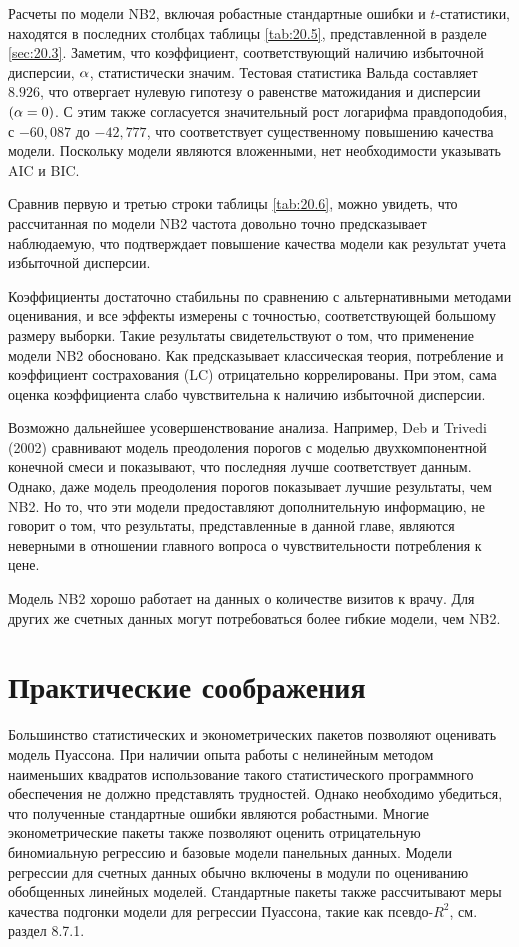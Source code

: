 Расчеты по модели NB2, включая робастные стандартные ошибки и $t$-статистики, находятся в последних столбцах таблицы \ref{tab:20.5}, представленной в разделе \ref{sec:20.3}. Заметим, что коэффициент, соответствующий наличию избыточной дисперсии, $\alpha$, статистически значим.
Тестовая статистика Вальда составляет $8.926$, что отвергает нулевую гипотезу о равенстве матожидания и дисперсии $(\alpha = 0)$. С этим также согласуется значительный рост логарифма правдоподобия, с $-60,087$ до $-42,777$, что соответствует существенному повышению качества модели. Поскольку модели являются вложенными, нет необходимости указывать AIC и BIC.

Сравнив первую и третью строки таблицы \ref{tab:20.6}, можно увидеть, что рассчитанная по модели NB2 частота довольно точно предсказывает наблюдаемую, что подтверждает повышение качества модели как результат учета избыточной дисперсии.

Коэффициенты достаточно стабильны по сравнению с альтернативными методами оценивания, и все эффекты измерены с точностью, соответствующей большому размеру выборки. Такие результаты свидетельствуют о том, что применение модели NB2 обосновано. Как предсказывает классическая теория, потребление и коэффициент сострахования (LC) отрицательно коррелированы. При этом, сама оценка коэффициента слабо чувствительна к наличию избыточной дисперсии.

Возможно дальнейшее усовершенствование анализа. Например, Deb и Trivedi (2002) сравнивают модель преодоления порогов с моделью двухкомпонентной конечной смеси и показывают, что последняя лучше соответствует данным. Однако, даже модель преодоления порогов показывает лучшие результаты, чем NB2. Но то, что эти модели предоставляют дополнительную информацию, не говорит о том, что результаты, представленные в данной главе, являются неверными в отношении главного вопроса о чувствительности потребления к цене.

Модель NB2 хорошо работает на данных о количестве визитов к врачу. Для других же счетных данных могут потребоваться более гибкие модели, чем NB2.




\section{Практические соображения}\label{sec:20.8}

\noindent
Большинство статистических и эконометрических пакетов позволяют оценивать модель Пуассона. При наличии опыта работы с нелинейным методом наименьших квадратов использование такого статистического программного обеспечения не должно представлять трудностей. Однако необходимо убедиться, что полученные стандартные ошибки являются робастными. Многие эконометрические пакеты также позволяют оценить отрицательную биномиальную регрессию и базовые модели панельных данных. Модели регрессии для счетных данных обычно включены в модули по оцениванию обобщенных линейных моделей. Стандартные пакеты также рассчитывают меры качества подгонки модели для регрессии Пуассона, такие как псевдо-$R^2$, см. раздел 8.7.1.

